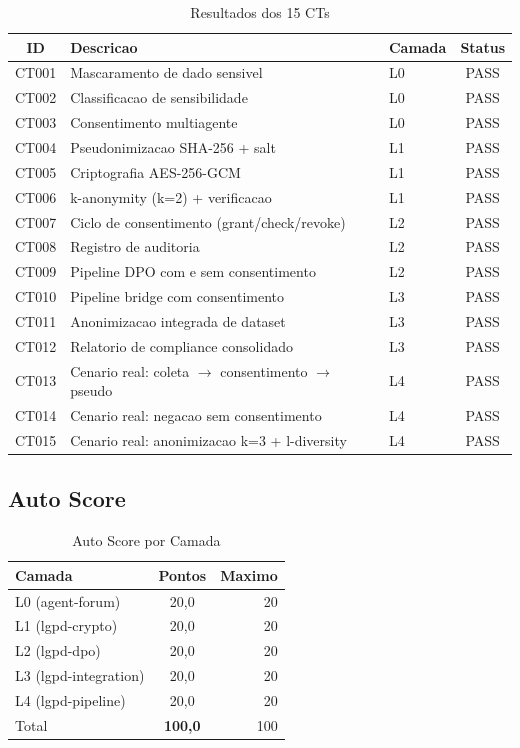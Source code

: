 \documentclass[5p]{elsarticle}
\begin{document}
\begin{table}[H]
\centering
\caption{Resultados dos 15 CTs}
\label{tab:resultados}
\begin{tabular}{cllc}
\toprule
ID & Descricao & Camada & Status \\
\midrule
CT001 & Mascaramento de dado sensivel & L0 & PASS \\
CT002 & Classificacao de sensibilidade & L0 & PASS \\
CT003 & Consentimento multiagente & L0 & PASS \\
CT004 & Pseudonimizacao SHA-256 + salt & L1 & PASS \\
CT005 & Criptografia AES-256-GCM & L1 & PASS \\
CT006 & k-anonymity (k=2) + verificacao & L1 & PASS \\
CT007 & Ciclo de consentimento (grant/check/revoke) & L2 & PASS \\
CT008 & Registro de auditoria & L2 & PASS \\
CT009 & Pipeline DPO com e sem consentimento & L2 & PASS \\
CT010 & Pipeline bridge com consentimento & L3 & PASS \\
CT011 & Anonimizacao integrada de dataset & L3 & PASS \\
CT012 & Relatorio de compliance consolidado & L3 & PASS \\
CT013 & Cenario real: coleta $\rightarrow$ consentimento $\rightarrow$ pseudo & L4 & PASS \\
CT014 & Cenario real: negacao sem consentimento & L4 & PASS \\
CT015 & Cenario real: anonimizacao k=3 + l-diversity & L4 & PASS \\
\bottomrule
\end{tabular}
\end{table}

\subsection{Auto Score}

\begin{table}[H]
\centering
\caption{Auto Score por Camada}
\label{tab:score}
\begin{tabular}{lcr}
\toprule
Camada & Pontos & Maximo \\
\midrule
L0 (agent-forum) & 20,0 & 20 \\
L1 (lgpd-crypto) & 20,0 & 20 \\
L2 (lgpd-dpo) & 20,0 & 20 \\
L3 (lgpd-integration) & 20,0 & 20 \\
L4 (lgpd-pipeline) & 20,0 & 20 \\
\midrule
Total & \textbf{100,0} & 100 \\
\bottomrule
\end{tabular}
\end{table}
\end{document}
